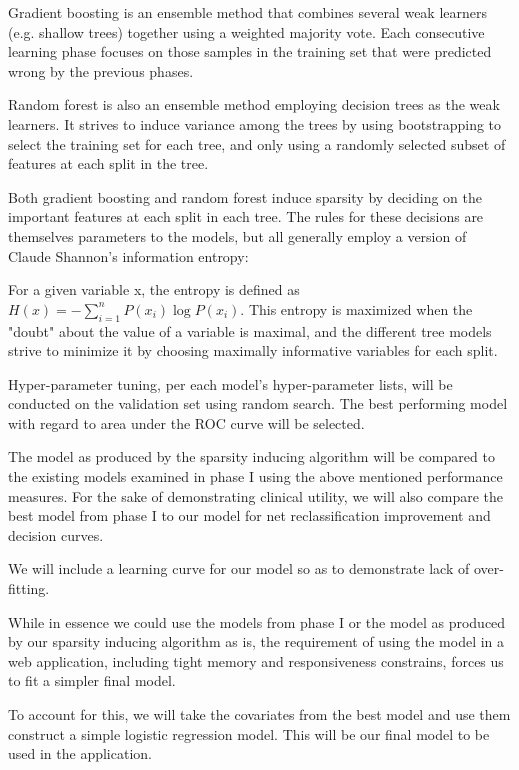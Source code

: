 \documentclass[a4paper,12pt]{article}
\begin{document}
		Gradient boosting is an ensemble method that combines several weak learners (e.g. shallow trees) together using a weighted majority vote. Each consecutive learning phase focuses on those samples in the training set that were predicted wrong by the previous phases.
		
		Random forest is also an ensemble method employing decision trees as the weak learners. It strives to induce variance among the trees by using bootstrapping to select the training set for each tree, and only using a randomly selected subset of features at each split in the tree.
		
		Both gradient boosting and random forest induce sparsity by deciding on the important features at each split in each tree. The rules for these decisions are themselves parameters to the models, but all generally employ a version of Claude Shannon's information entropy:
		
		For a given variable x, the entropy is defined as $ H(x) = -\sum_{i=1}^{n} P(x_i) \log P(x_i)$. This entropy is maximized when the "doubt" about the value of a variable is maximal, and the different tree models strive to minimize it by choosing maximally informative variables for each split.
		
		Hyper-parameter tuning, per each model's hyper-parameter lists, will be conducted on the validation set using random search\cite{Bergstra2012}. The best performing model with regard to area under the ROC curve will be selected.
		
		The model as produced by the sparsity inducing algorithm will be compared to the existing models examined in phase I using the above mentioned performance measures. For the sake of demonstrating clinical utility, we will also compare the best model from phase I to our model for net reclassification improvement\cite{Pencina2008} and decision curves\cite{Vickers2016}.
		
		We will include a learning curve for our model so as to demonstrate lack of over-fitting.
		
		While in essence we could use the models from phase I or the model as produced by our sparsity inducing algorithm as is, the requirement of using the model in a web application, including tight memory and responsiveness constrains, forces us to fit a simpler final model.
		
		To account for this, we will take the covariates from the best model and use them construct a simple logistic regression model. This will be our final model to be used in the application.
		
\end{document}

